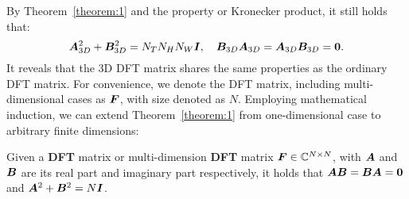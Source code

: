 By Theorem~\ref{theorem:1} and the property or Kronecker product, it still holds that:
\begin{equation}
    {\bm{A}}_{3D}^2+{\bm{B}}_{3D}^2=N_T N_H N_W{\bm{I}},\quad {\bm{B}}_{3D}{\bm{A}}_{3D}={\bm{A}}_{3D}{\bm{B}}_{3D}=\mathbf{0}.
\end{equation}
It reveals that the 3D DFT matrix shares the same properties as the ordinary DFT matrix.
For convenience, we denote the DFT matrix, including multi-dimensional cases as ${\bm{F}}$, with size denoted as $N$.
Employing mathematical induction, we can extend Theorem~\ref{theorem:1} from one-dimensional case to arbitrary finite dimensions:
\begin{theorem}
\label{theorem:dft}
    Given a \textbf{DFT} matrix or multi-dimension \textbf{DFT} matrix ${\bm{F}}\in \mathbb{C}^{N\times N}$, with ${\bm{A}}$ and ${\bm{B}}$ are its real part and imaginary part respectively, it holds that ${\bm{A}}{\bm{B}}={\bm{B}}{\bm{A}}=\mathbf{0}$ and ${\bm{A}}^2+{\bm{B}}^2=N{\bm{I}}$.
\end{theorem}